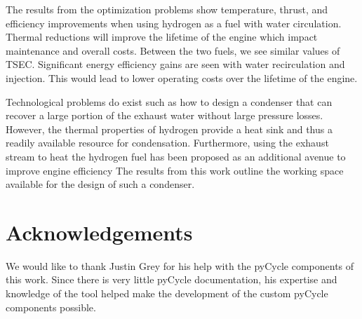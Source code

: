 \documentclass[conf]{new-aiaa}
\begin{document}
The results from the optimization problems show temperature, thrust, and efficiency improvements when using hydrogen as a fuel with water circulation.
Thermal reductions will improve the lifetime of the engine which impact maintenance and overall costs.
Between the two fuels, we see similar values of TSEC.
Significant energy efficiency gains are seen with water recirculation and injection.
This would lead to lower operating costs over the lifetime of the engine.

Technological problems do exist such as how to design a condenser that can recover a large portion of the exhaust water without large pressure losses.
However, the thermal properties of hydrogen provide a heat sink and thus a readily available resource for condensation.
Furthermore, using the exhaust stream to heat the hydrogen fuel has been proposed as an additional avenue to improve engine efficiency%
The results from this work outline the working space available for the design of such a condenser.

\section{Acknowledgements}
We would like to thank Justin Grey for his help with the pyCycle components of this work.
Since there is very little pyCycle documentation, his expertise and knowledge of the tool helped make the development of the custom pyCycle components possible.


\end{document}
